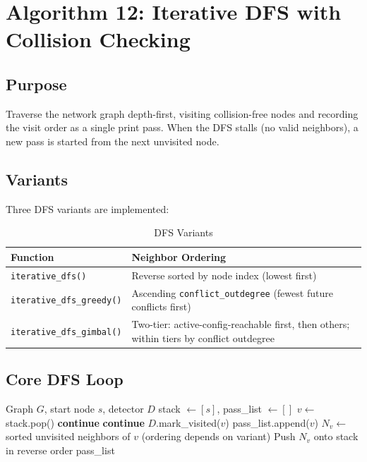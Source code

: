 \documentclass[11pt,a4paper]{article}
\newcommand{\funcname}[1]{\texttt{\textcolor{codepurple}{#1}}}
\begin{document}
\section{Algorithm 12: Iterative DFS with Collision Checking}
\label{sec:dfs}

\subsection{Purpose}

Traverse the network graph depth-first, visiting collision-free nodes and recording the visit order as a single print pass. When the DFS stalls (no valid neighbors), a new pass is started from the next unvisited node.

\subsection{Variants}

Three DFS variants are implemented:

\begin{table}[H]
\centering
\caption{DFS Variants}
\begin{tabular}{lp{7cm}}
\toprule
\textbf{Function} & \textbf{Neighbor Ordering} \\
\midrule
\funcname{iterative\_dfs()} & Reverse sorted by node index (lowest first) \\
\funcname{iterative\_dfs\_greedy()} & Ascending \texttt{conflict\_outdegree} (fewest future conflicts first) \\
\funcname{iterative\_dfs\_gimbal()} & Two-tier: active-config-reachable first, then others; within tiers by conflict outdegree \\
\bottomrule
\end{tabular}
\end{table}

\subsection{Core DFS Loop}

\begin{algorithm}[H]
\caption{Iterative DFS with Collision Checking}
\begin{algorithmic}[1]
\Require Graph $G$, start node $s$, detector $D$
\State stack $\gets [s]$, pass\_list $\gets []$
    \State $v \gets$ stack.pop()
     \textbf{continue} \EndIf
     \textbf{continue} \EndIf
    \State $D$.mark\_visited($v$)
    \State pass\_list.append($v$)
    \State $N_v \gets$ sorted unvisited neighbors of $v$ (ordering depends on variant)
    \State Push $N_v$ onto stack in reverse order
\EndWhile
\State \Return pass\_list
\end{algorithmic}
\end{algorithm}
\end{document}
